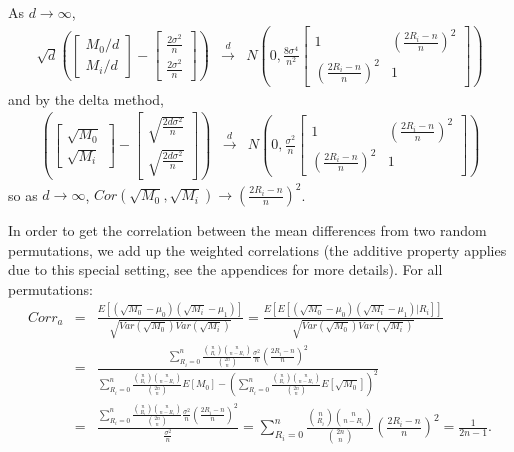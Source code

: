 \documentclass[12pt]{article}
\begin{document}
\begin{appendices}
As $d\to \infty$,
\begin{eqnarray*}
\sqrt{d}(\begin{bmatrix}
M_0/d \\
M_i/d
\end{bmatrix}-\begin{bmatrix}
\frac{2\sigma^2}{n} \\
\frac{2\sigma^2}{n} 
\end{bmatrix})&\xrightarrow[]{d}& N(0, \frac{8\sigma^4 }{n^2}\begin{bmatrix}
1& (\frac{2R_i-n}{n})^2\\
 (\frac{2R_i-n}{n})^2&1
\end{bmatrix})
\end{eqnarray*}
and by the delta method,
\begin{eqnarray*}
(\begin{bmatrix}
\sqrt{M_0} \\
\sqrt{M_i}
\end{bmatrix}-\begin{bmatrix}
\sqrt{\frac{2d\sigma^2}{n}} \\
\sqrt{\frac{2d\sigma^2}{n}} 
\end{bmatrix})&\xrightarrow[]{d}& N(0, \frac{\sigma^2 }{n}\begin{bmatrix}
1& (\frac{2R_i-n}{n})^2\\
 (\frac{2R_i-n}{n})^2&1
\end{bmatrix})
\end{eqnarray*}
so as $d\to \infty$, $Cor(\sqrt{M_0}, \sqrt{M_i})\to(\frac{2R_i-n}{n})^2$. 

In order to get the correlation between the mean differences from two random permutations, we add up the weighted correlations (the additive property applies due to this special setting, see the appendices for more details). For all permutations:
\begin{eqnarray*}
Corr_a&=&\frac{E[(\sqrt{M_0}-\mu_0)(\sqrt{M_i}-\mu_1)]}{\sqrt{Var(\sqrt{M_0})Var(\sqrt{M_i})}}=\frac{E[E[(\sqrt{M_0}-\mu_0)(\sqrt{M_i}-\mu_1)|R_i]]}{\sqrt{Var(\sqrt{M_0})Var(\sqrt{M_i})}}\\
&=&\frac{\sum_{R_i=0}^n \frac{{n \choose R_i}{n \choose n-R_i}}{{2n \choose n}}\frac{\sigma^2 }{n} (\frac{2R_i-n}{n})^2}{\sum_{R_i=0}^n \frac{{n \choose R_i}{n \choose n-R_i}}{{2n \choose n}}E[M_0]-(\sum_{R_i=0}^n \frac{{n \choose R_i}{n \choose n-R_i}}{{2n \choose n}}E[\sqrt{M_0}])^2}\\
&=&\frac{\sum_{R_i=0}^n \frac{{n \choose R_i}{n \choose n-R_i}}{{2n \choose n}}\frac{\sigma^2 }{n} (\frac{2R_i-n}{n})^2}{\frac{\sigma^2 }{n}}
=\sum_{R_i=0}^n \frac{{n \choose R_i}{n \choose n-R_i}}{{2n \choose n}}(\frac{2R_i-n}{n})^2=\frac{1}{2n-1}.
\end{eqnarray*}




\end{appendices}
\end{document}
